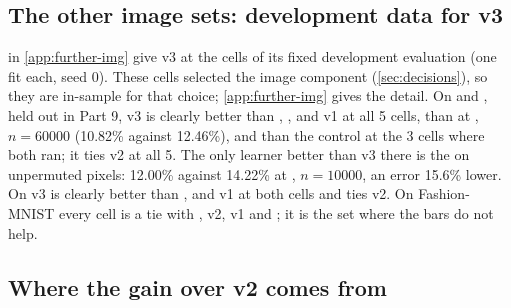 \subsection{The other image sets: development data for v3}\label{sec:res-img-dev}

 in \cref{app:further-img} give v3 at the cells of its fixed development evaluation (one fit each, seed 0). These cells selected the image component (\cref{sec:decisions}), so they are in-sample for that choice; \cref{app:further-img} gives the detail. On  and , held out in Part 9, v3 is clearly better than , ,  and v1 at all 5 cells, than  at , $n=60000$ (10.82\% against 12.46\%), and than the control  at the 3 cells where both ran; it ties v2 at all 5. The only learner better than v3 there is the  on unpermuted pixels: 12.00\% against 14.22\% at , $n=10000$, an error 15.6\% lower. On  v3 is clearly better than ,  and v1 at both cells and ties v2. On Fashion-MNIST every cell is a tie with , v2, v1 and ; it is the set where the bars do not help.

\subsection{Where the gain over v2 comes from}\label{sec:res-img-gain}

\begin{table}[tbp]
\centering{\footnotesize\setlength{\tabcolsep}{2.6pt}
}
\caption{What carries v3 and v2 on the held-out image sets . Left: stacking weight per member family (seed mean of 3 fits at $n\le10000$; one fit at $n=60000$). : nearest-neighbour votes on the pooled sums. : nearest-neighbour votes on the pixels. ``rest'': Part 8's ,  and ;  has weight 0 in every fit here. Right: out-of-fold error on the training rows of the two boosters and of the whole stack (5-fold at $n\le3000$; one holdout of 2000 rows at $n=10000$ and 6000 rows at $n=60000$). 's out-of-fold error is the same in v3 and v2 in every fit. The weights are not shares of the decision (\cref{sec:interp-img-members}). Source: \texttt{hyb\_portfolio\{3,2\}\_\_qd\_\{c,d\}.info.json} in .}
\label{tab:img-stack}
\end{table}

